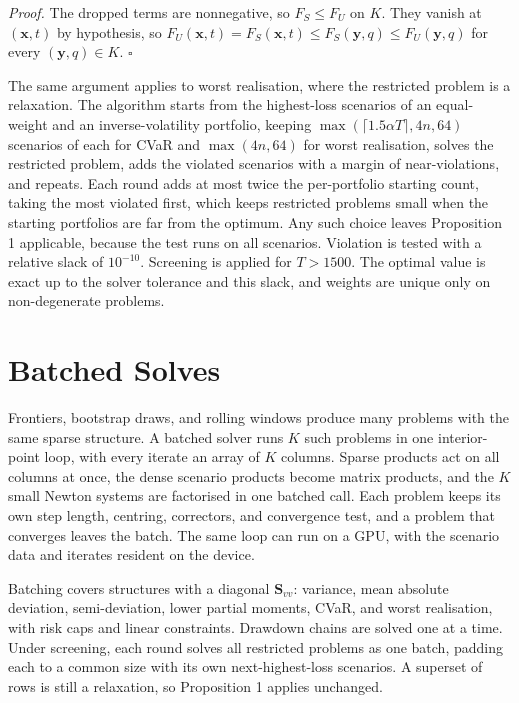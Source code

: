 \documentclass[10pt,twocolumn,letterpaper]{article}
\begin{document}
\textit{Proof.} The dropped terms are nonnegative, so $F_S \le F_U$ on $K$. They vanish at $(\mathbf{x}, t)$ by hypothesis, so $F_U(\mathbf{x}, t) = F_S(\mathbf{x}, t) \le F_S(\mathbf{y}, q) \le F_U(\mathbf{y}, q)$ for every $(\mathbf{y}, q) \in K$. $\square$

The same argument applies to worst realisation, where the restricted problem is a relaxation. The algorithm starts from the highest-loss scenarios of an equal-weight and an inverse-volatility portfolio, keeping $\max(\lceil 1.5\alpha T \rceil, 4n, 64)$ scenarios of each for CVaR and $\max(4n, 64)$ for worst realisation, solves the restricted problem, adds the violated scenarios with a margin of near-violations, and repeats. Each round adds at most twice the per-portfolio starting count, taking the most violated first, which keeps restricted problems small when the starting portfolios are far from the optimum. Any such choice leaves Proposition 1 applicable, because the test runs on all scenarios. Violation is tested with a relative slack of $10^{-10}$. Screening is applied for $T > 1500$. The optimal value is exact up to the solver tolerance and this slack, and weights are unique only on non-degenerate problems.

\section{Batched Solves}

Frontiers, bootstrap draws, and rolling windows produce many problems with the same sparse structure. A batched solver runs $K$ such problems in one interior-point loop, with every iterate an array of $K$ columns. Sparse products act on all columns at once, the dense scenario products become matrix products, and the $K$ small Newton systems are factorised in one batched call. Each problem keeps its own step length, centring, correctors, and convergence test, and a problem that converges leaves the batch. The same loop can run on a GPU, with the scenario data and iterates resident on the device.

Batching covers structures with a diagonal $\mathbf{S}_{vv}$: variance, mean absolute deviation, semi-deviation, lower partial moments, CVaR, and worst realisation, with risk caps and linear constraints. Drawdown chains are solved one at a time. Under screening, each round solves all restricted problems as one batch, padding each to a common size with its own next-highest-loss scenarios. A superset of rows is still a relaxation, so Proposition 1 applies unchanged.
\end{document}
